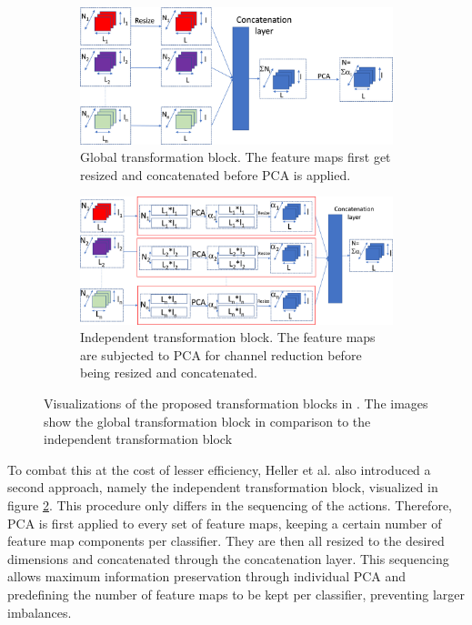 \begin{figure}[H]
 \captionsetup[subfigure]{justification=centering}
 \centering
\begin{subfigure}[b]{0.4\textwidth} %
 \centering
 \includegraphics[width=\textwidth]{figures/global_transformation_block.jpg}
 \caption{Global transformation block. The feature maps first get resized and concatenated before PCA is applied.}
 \label{fig:GTBheller}
 \end{subfigure}
 \hspace{0.05\textwidth} %
 \begin{subfigure}[b]{0.4\textwidth} %
 \centering
 \includegraphics[width=\textwidth]{figures/independent_transformation_block.jpg}
 \caption{Independent transformation block. The feature maps are subjected to PCA for channel reduction before being resized and concatenated.}
 \label{fig:ITBheller}
\end{subfigure}
 
 \caption{Visualizations of the proposed transformation blocks in \cite{EnsembleHeller2023}. The images show the global transformation 
block in comparison to the independent transformation block \cite{EnsembleHeller2023}}
 \label{fig:hellerensembleblocks}
\end{figure}




To combat this at the cost of lesser efficiency, Heller et al. also introduced a second approach, namely the independent transformation block, 
visualized in figure \ref{fig:ITBheller}. 
This procedure only differs in the sequencing of the actions. Therefore, PCA is first applied to every set of feature maps, keeping 
a certain number of feature map components per classifier. They are then all resized to the desired dimensions and concatenated through 
the concatenation layer. This sequencing allows maximum information preservation through individual PCA and predefining the number 
of feature maps to be kept per classifier, preventing larger imbalances.



